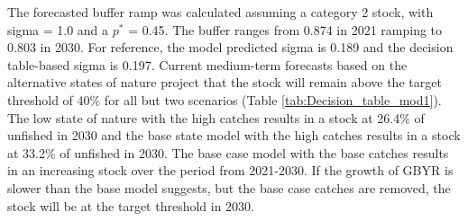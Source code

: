 \documentclass[12pt,]{article}
\begin{document}
The forecasted buffer ramp was calculated assuming a category 2 stock,
with sigma = 1.0 and a \(p^*\) = 0.45. The buffer ranges from 0.874 in
2021 ramping to 0.803 in 2030. For reference, the model predicted sigma
is 0.189 and the decision table-based sigma is 0.197. Current
medium-term forecasts based on the alternative states of nature project
that the stock will remain above the target threshold of 40\% for all
but two scenarios (Table \ref{tab:Decision_table_mod1}). The low state
of nature with the high catches results in a stock at 26.4\% of unfished
in 2030 and the base state model with the high catches results in a
stock at 33.2\% of unfished in 2030. The base case model with the base
catches results in an increasing stock over the period from 2021-2030.
If the growth of GBYR is slower than the base model suggests, but the
base case catches are removed, the stock will be at the target threshold
in 2030.
\end{document}
